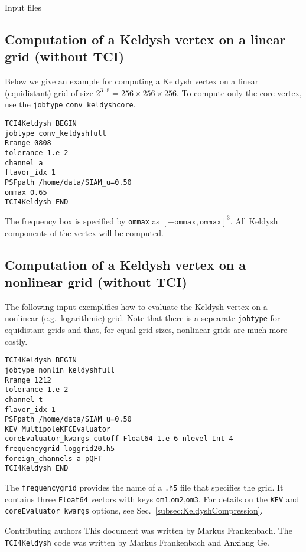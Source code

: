 \documentclass[12pt]{article}
\begin{document}
\begin{section}{Input files}
\subsection{Computation of a Keldysh vertex on a linear grid (without TCI)}
Below we give an example for computing a Keldysh vertex on a linear (equidistant) grid of size
$2^{3\cdot8}=256\times256\times256$.
To compute only the core vertex, use the \texttt{jobtype} \texttt{conv\_keldyshcore}.
\begin{verbatim}
TCI4Keldysh BEGIN
jobtype conv_keldyshfull
Rrange 0808
tolerance 1.e-2
channel a
flavor_idx 1
PSFpath /home/data/SIAM_u=0.50
ommax 0.65
TCI4Keldysh END 
\end{verbatim}
The frequency box is specified by \texttt{ommax} as $[-\texttt{ommax},\texttt{ommax}]^3$.
All Keldysh components of the vertex will be computed.

\subsection{Computation of a Keldysh vertex on a nonlinear grid (without TCI)}
The following input exemplifies how to evaluate the Keldysh vertex on a nonlinear (e.g.\ logarithmic) grid.
Note that there is a sepearate \texttt{jobtype} for equidistant grids and that, for equal grid sizes,
nonlinear grids are much more costly.
\begin{verbatim}
TCI4Keldysh BEGIN
jobtype nonlin_keldyshfull
Rrange 1212
tolerance 1.e-2
channel t
flavor_idx 1
PSFpath /home/data/SIAM_u=0.50
KEV MultipoleKFCEvaluator
coreEvaluator_kwargs cutoff Float64 1.e-6 nlevel Int 4
frequencygrid loggrid20.h5
foreign_channels a pQFT
TCI4Keldysh END 
\end{verbatim}
The \texttt{frequencygrid} provides the name of a \texttt{.h5} file that specifies the
grid. It contains three \texttt{Float64} vectors with keys \texttt{om1},\texttt{om2},\texttt{om3}.
For details on the \texttt{KEV} and \texttt{coreEvaluator\_kwargs} options, see Sec.\ \ref{subsec:KeldyshCompression}.
\end{section}

\begin{section}{Contributing authors}
This document was written by Markus Frankenbach. The \texttt{TCI4Keldysh} code was
written by Markus Frankenbach and Anxiang Ge.
\end{section}

\nocite{*}


\end{document}
